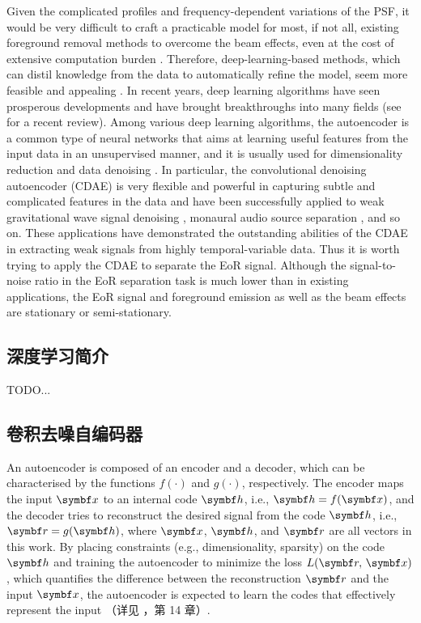 Given the complicated profiles and frequency-dependent variations of
the PSF, it would be very difficult to craft a practicable model for most,
if not all, existing foreground removal methods to overcome the beam
effects, even at the cost of extensive computation burden
\cite{lochner2015}.
Therefore, deep-learning-based methods, which can distil knowledge from
the data to automatically refine the model, seem more feasible
and appealing \cite{herbel2018,vafaeiSadr2019}.
In recent years, deep learning algorithms have seen prosperous
developments and have brought breakthroughs into many fields
(see  for a recent review).
Among various deep learning algorithms, the autoencoder is a common type of
neural networks that aims at learning useful features from the input data
in an unsupervised manner, and it is usually used for dimensionality
reduction \cite{hinton2006,wang2014} and data denoising
\cite{xie2012,lu2013,bengio2013}.
In particular,
the convolutional denoising autoencoder (CDAE) is very flexible and
powerful in capturing subtle and complicated features in the data and have
been successfully applied to weak gravitational wave signal denoising
\cite{shen2017}, monaural audio source separation
\cite{grais2017}, and so on.
These applications have demonstrated the outstanding abilities of the
CDAE in extracting weak signals from highly temporal-variable data.
Thus it is worth trying to apply the CDAE to separate the EoR signal.
Although the signal-to-noise ratio in the EoR separation task is much lower
than in existing applications, the EoR signal and foreground emission as
well as the beam effects are stationary or semi-stationary.

\subsection{深度学习简介}

TODO...

\subsection{卷积去噪自编码器}
\label{sec:cdae}

An autoencoder is composed of an encoder and a decoder, which can be
characterised by the functions $f(\cdot)$ and $g(\cdot)$, respectively.
The encoder maps the input $\B{x}$ to an internal code $\B{h}$, i.e.,
$\B{h} = f(\B{x})$, and the decoder tries to reconstruct the desired
signal from the code $\B{h}$, i.e., $\B{r} = g(\B{h})$, where $\B{x}$,
$\B{h}$, and $\B{r}$ are all vectors in this work.
By placing constraints (e.g., dimensionality, sparsity) on the
code $\B{h}$ and training the autoencoder to minimize the
loss $L(\B{r}, \,\B{x})$, which quantifies the difference between the
reconstruction $\B{r}$ and the input $\B{x}$, the autoencoder is expected
to learn the codes that effectively represent the input
（详见 ，第 14 章）.

